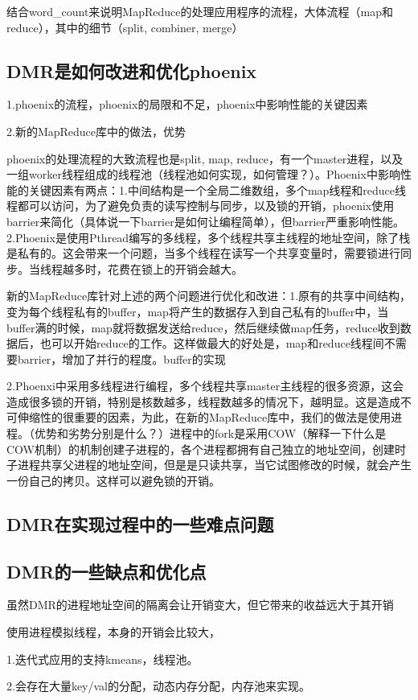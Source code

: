{\color{red}结合word\_count来说明MapReduce的处理应用程序的流程，大体流程（map和reduce），其中的细节（split, combiner, merge）}


\subsection{DMR是如何改进和优化phoenix}
1.phoenix的流程，phoenix的局限和不足，phoenix中影响性能的关键因素

2.新的MapReduce库中的做法，优势


phoenix的处理流程的大致流程也是split, map, reduce，有一个master进程，以及一组worker线程组成的线程池（线程池如何实现，如何管理？）。Phoenix中影响性能的关键因素有两点：1.中间结构是一个全局二维数组，多个map线程和reduce线程都可以访问，为了避免负责的读写控制与同步，以及锁的开销，phoenix使用barrier来简化（具体说一下barrier是如何让编程简单），但barrier严重影响性能。2.Phoenix是使用Pthread编写的多线程，多个线程共享主线程的地址空间，除了栈是私有的。这会带来一个问题，当多个线程在读写一个共享变量时，需要锁进行同步。当线程越多时，花费在锁上的开销会越大。

新的MapReduce库针对上述的两个问题进行优化和改进：1.原有的共享中间结构，变为每个线程私有的buffer，map将产生的数据存入到自己私有的buffer中，当buffer满的时候，map就将数据发送给reduce，然后继续做map任务，reduce收到数据后，也可以开始reduce的工作。这样做最大的好处是，map和reduce线程间不需要barrier，增加了并行的程度。buffer的实现

2.Phoenxi中采用多线程进行编程，多个线程共享master主线程的很多资源，这会造成很多锁的开销，特别是核数越多，线程数越多的情况下，越明显。这是造成不可伸缩性的很重要的因素，为此，在新的MapReduce库中，我们的做法是使用进程。（优势和劣势分别是什么？）进程中的fork是采用COW（解释一下什么是COW机制）的机制创建子进程的，各个进程都拥有自己独立的地址空间，创建时子进程共享父进程的地址空间，但是是只读共享，当它试图修改的时候，就会产生一份自己的拷贝。这样可以避免锁的开销。



\subsection{DMR在实现过程中的一些难点问题}









\subsection{DMR的一些缺点和优化点}
虽然DMR的进程地址空间的隔离会让开销变大，但它带来的收益远大于其开销

使用进程模拟线程，本身的开销会比较大，

1.迭代式应用的支持kmeans，线程池。

2.会存在大量key/val的分配，动态内存分配，内存池来实现。

